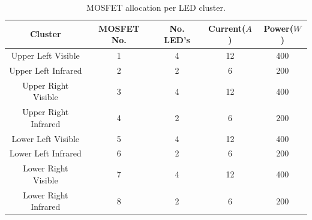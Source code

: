 \documentclass[fleqn,twoside,12pt]{report}
\begin{document}
\begin{table}
	\centering
	\caption{MOSFET allocation per LED cluster.}
	\label{tab:mosfets}
	\begin{tabular}{ccccc}
		\toprule
		Cluster & MOSFET No. & No. LED's & Current($A$) & Power($W$)  \\ 
		\midrule
		Upper Left Visible   	& 1 & 4 & 12 & 400   \\[6pt] 
		Upper Left Infrared		& 2 & 2 & 6  & 200   \\[6pt] 
		Upper Right Visible   	& 3 & 4 & 12 & 400   \\[6pt] 
		Upper Right Infrared	& 4 & 2 & 6  & 200   \\[6pt] 
		Lower Left Visible   	& 5 & 4 & 12 & 400   \\[6pt] 
		Lower Left Infrared		& 6 & 2 & 6  & 200   \\[6pt] 
		Lower Right Visible   	& 7 & 4 & 12 & 400   \\[6pt] 
		Lower Right Infrared	& 8 & 2 & 6  & 200   \\[6pt] 
		\bottomrule
	\end{tabular}
\end{table}
\end{document}
